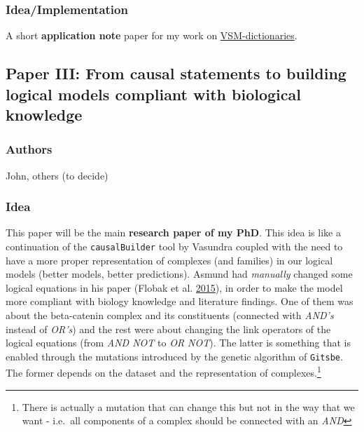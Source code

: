 \documentclass[12pt,]{book}
\let\rmarkdownfootnote\footnote%
\def\footnote{\protect\rmarkdownfootnote}
\begin{document}
\hypertarget{ideaimplementation}{%
\subsubsection*{Idea/Implementation}\label{ideaimplementation}}

A short \textbf{application note} paper for my work on \protect\hyperlink{vsm-dict}{VSM-dictionaries}.

\hypertarget{paper-iii-from-causal-statements-to-building-logical-models-compliant-with-biological-knowledge}{%
\subsection*{Paper III: From causal statements to building logical models compliant with biological knowledge}\label{paper-iii-from-causal-statements-to-building-logical-models-compliant-with-biological-knowledge}}

\hypertarget{authors-2}{%
\subsubsection*{Authors}\label{authors-2}}

John, others (to decide)

\hypertarget{idea-1}{%
\subsubsection*{Idea}\label{idea-1}}

This paper will be the main \textbf{research paper of my PhD}.
This idea is like a continuation of the \texttt{causalBuilder} tool by Vasundra coupled with the
need to have a more proper representation of complexes (and families) in our
logical models (better models, better predictions). Asmund had \emph{manually} changed some logical equations in his paper
(Flobak et al. \protect\hyperlink{ref-Flobak2015}{2015}), in order to make the model more compliant with biology knowledge
and literature findings. One of them was about the beta-catenin complex and its
constituents (connected with \emph{AND's} instead of \emph{OR's}) and the rest were about changing the link operators of the logical
equations (from \emph{AND NOT} to \emph{OR NOT}). The latter is something that is enabled
through the mutations introduced by the genetic algorithm of \texttt{Gitsbe}. The former
depends on the dataset and the representation of complexes.\footnote{There is actually a mutation that can change this but not in the way that we want - i.e.~all components of a complex
  should be connected with an \emph{AND}}
\end{document}
